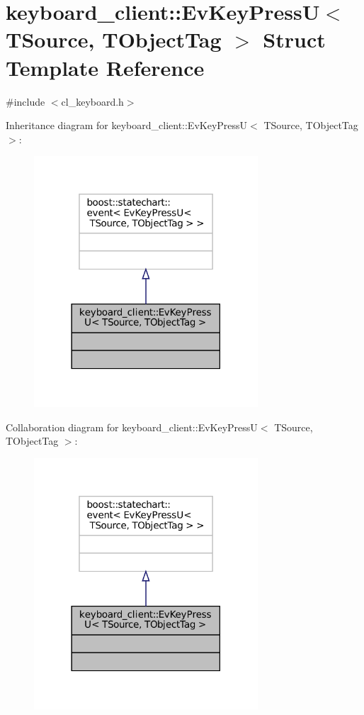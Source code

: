 \hypertarget{structkeyboard__client_1_1EvKeyPressU}{}\section{keyboard\+\_\+client\+:\+:Ev\+Key\+PressU$<$ T\+Source, T\+Object\+Tag $>$ Struct Template Reference}
\label{structkeyboard__client_1_1EvKeyPressU}


{\ttfamily \#include $<$cl\+\_\+keyboard.\+h$>$}



Inheritance diagram for keyboard\+\_\+client\+:\+:Ev\+Key\+PressU$<$ T\+Source, T\+Object\+Tag $>$\+:
\nopagebreak
\begin{figure}[H]
\begin{center}
\leavevmode
\includegraphics[width=237pt]{structkeyboard__client_1_1EvKeyPressU__inherit__graph}
\end{center}
\end{figure}


Collaboration diagram for keyboard\+\_\+client\+:\+:Ev\+Key\+PressU$<$ T\+Source, T\+Object\+Tag $>$\+:
\nopagebreak
\begin{figure}[H]
\begin{center}
\leavevmode
\includegraphics[width=237pt]{structkeyboard__client_1_1EvKeyPressU__coll__graph}
\end{center}
\end{figure}


